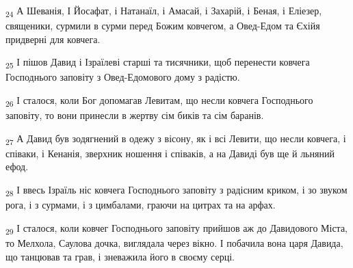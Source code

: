 \begin{tcolorbox}
\textsubscript{24} А Шеванія, І Йосафат, і Натанаїл, і Амасай, і Захарій, і Беная, і Еліезер, священики, сурмили в сурми перед Божим ковчегом, а Овед-Едом та Єхійя придверні для ковчега.
\end{tcolorbox}
\begin{tcolorbox}
\textsubscript{25} І пішов Давид і Ізраїлеві старші та тисячники, щоб перенести ковчега Господнього заповіту з Овед-Едомового дому з радістю.
\end{tcolorbox}
\begin{tcolorbox}
\textsubscript{26} І сталося, коли Бог допомагав Левитам, що несли ковчега Господнього заповіту, то вони принесли в жертву сім биків та сім баранів.
\end{tcolorbox}
\begin{tcolorbox}
\textsubscript{27} А Давид був зодягнений в одежу з вісону, як і всі Левити, що несли ковчега, і співаки, і Кенанія, зверхник ношення і співаків, а на Давиді був ще й льняний ефод.
\end{tcolorbox}
\begin{tcolorbox}
\textsubscript{28} І ввесь Ізраїль ніс ковчега Господнього заповіту з радісним криком, і зо звуком рога, і з сурмами, і з цимбалами, граючи на цитрах та на арфах.
\end{tcolorbox}
\begin{tcolorbox}
\textsubscript{29} І сталося, коли ковчег Господнього заповіту прийшов аж до Давидового Міста, то Мелхола, Саулова дочка, виглядала через вікно. І побачила вона царя Давида, що танцював та грав, і зневажила його в своєму серці.
\end{tcolorbox}
